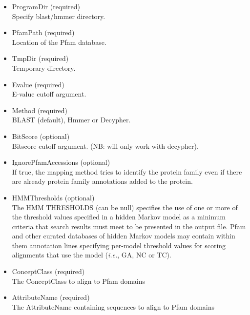 \begin{itemize}
  
  \item{ProgramDir (required)}\\
  Specify blast/hmmer directory.
  
  \item{PfamPath (required)}\\
  Location of the Pfam database.
  
  \item{TmpDir (required)}\\
  Temporary directory.
  
  \item{Evalue (required)}\\
  E-value cutoff argument.
  
  \item{Method (required)}\\
  BLAST (default), Hmmer or Decypher.
  
  \item{BitScore (optional)}\\
  Bitscore cutoff argument. (NB: will only work with decypher).
  
  \item{IgnorePfamAccessions (optional)}\\
  If true, the mapping method tries to identify the protein family even if there are already protein family annotations added to the protein.
  
  \item{HMMThresholds (optional)}\\
  The HMM THRESHOLDS (can be null) specifies the use of one or more of the threshold values specified in a hidden Markov model as a minimum criteria 
  that search results must meet to be presented in the output file. 
  Pfam and other curated databases of hidden Markov models may contain within them annotation lines specifying per-model threshold values 
  for scoring alignments that use the model ({\it{i.e.}}, GA, NC or TC).
  
  \item{ConceptClass (required)}\\
  The ConceptClass to align to Pfam domains
  
  \item{AttributeName (required)}\\
  The AttributeName containing sequences to align to Pfam domains

\end{itemize}


